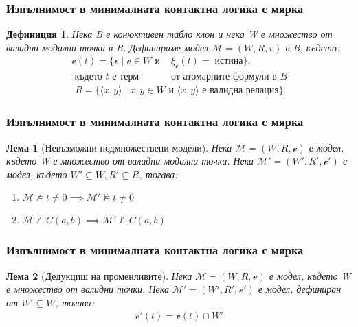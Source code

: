 \documentclass{beamer}
\newtheorem{defn}{Дефиниция}[section]
\newtheorem{lema}{Лема}[section]
\newcommand{\curvedE}{\mathscr{e}}
\newcommand{\vE}{\mathscr{v}}
\newcommand{\vBool}{\xi}
\begin{document}
\begin{frame}\frametitle{Изпълнимост в минималната контактна логика с мярка}
	\begin{defn}
Нека B е конюктивен табло клон и нека W е множество от валидни модални точки в B. Дефинираме модел $\mathcal{M} = (W, R, v)$ в B, където:
		\begin{align*}
				\vE(t) = \{ \curvedE \; | \; \curvedE \in W \textit{ и } &\vBool_{\curvedE}(t) =\; \textit{истина} \}, \\
				\textit{ където t е терм } & \textit{от атомарните формули в B}
		\end{align*}
		\begin{align*}
				R = \{ \langle x, y \rangle\; | \; x, y \in W \textit{ и } \langle x, y \rangle \textit{ е валидна релация}\}
		\end{align*}
	\end{defn}
\end{frame}

\begin{frame}\frametitle{Изпълнимост в минималната контактна логика с мярка}
\begin{lema}[Невъзможни подмножествени модели]
Нека $\mathcal{M} = (W, R, \vE)$ е модел, където W е множество от валидни модални точки.
Нека $\mathcal{M'} = (W', R', \vE')$ е модел, където $W' \subseteq W, R' \subseteq R$, тогава:
	\begin{enumerate}
		\item $\mathcal{M} \not\models t \neq 0 \implies \mathcal{M'} \not\models t \neq 0$
		\item $\mathcal{M} \not\models C(a,b) \implies \mathcal{M'} \not\models C(a,b)$
	\end{enumerate}
	\end{lema}
\end{frame}

\begin{frame}\frametitle{Изпълнимост в минималната контактна логика с мярка}
	\begin{lema}[Дедукциш на променливите]
		Нека $\mathcal{M} = (W, R, \vE)$ е модел, където W е множество от валидни точки.
		Нека $\mathcal{M'} = (W', R', \vE')$ е модел, дефиниран от $W' \subseteq W$, тогава:
		\begin{align*}
			\vE'(t) =  \vE(t) \cap W'
		\end{align*}
	\end{lema}
\end{frame}
\end{document}
